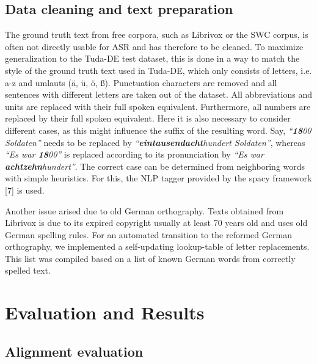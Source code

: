 \documentclass[runningheads]{llncs}
\begin{document}
\subsection{Data cleaning and text preparation}
The ground truth text from free corpora, such as Librivox or the SWC corpus, is often not directly usable for ASR and has therefore to be cleaned. To maximize generalization to the Tuda-DE test dataset, this is done in a way to match the style of the ground truth text used in Tuda-DE, which only consists of letters, i.e. a-z and umlauts ({\"a}, {\"u}, {\"o}, {\ss}).
Punctuation characters are removed and all sentences with different letters are taken out of the dataset. 
All abbreviations and units are replaced with their full spoken equivalent.
Furthermore, all numbers are replaced by their full spoken equivalent.
Here it is also necessary to consider different cases, as this might influence the suffix of the resulting word. Say, \emph{``\textbf{18}00 Soldaten''} needs to be replaced by \emph{``\textbf{eintausendacht}hundert Soldaten''}, whereas \emph{``Es war \textbf{18}00''} is replaced according to its pronunciation by \emph{``Es war \textbf{achtzehn}hundert''}.
The correct case can be determined from neighboring words with simple heuristics.
For this, the NLP tagger provided by the spacy framework [7] is used.

Another issue arised due to old German orthography.
Texts obtained from Librivox is due to its expired copyright usually at least 70 years old and uses old German spelling rules.
For an automated transition to the reformed German orthography,
we implemented a self-updating lookup-table of letter replacements.
This list was compiled based on a list of known German words from correctly spelled text.


\section{Evaluation and Results}

\subsection{Alignment evaluation}
\end{document}
